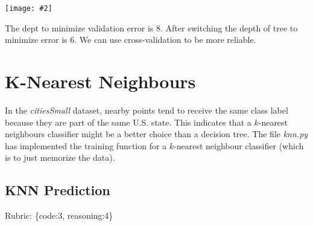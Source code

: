 \documentclass{article}
\def\gre#1{{\color{gre}#1}}
\newcommand{\fig}[2]{\texttt{[image: \#2]}}
\def\rubric#1{\gre{Rubric: \{#1\}}}{}
\begin{document}
\fig{0.5}{../figs/q3_2_tree_errors}

The dept to minimize validation error is 8. After switching the depth of tree to minimize error is 6. We can use cross-validation to be more reliable.

\section{K-Nearest Neighbours}

In the \emph{citiesSmall} dataset, nearby points tend to receive the same class label because they are part of the same U.S. state. This indicates that a $k$-nearest neighbours classifier might be a better choice than a decision tree. The file \emph{knn.py} has implemented the training function for a $k$-nearest neighbour classifier (which is to just memorize the data).


\subsection{KNN Prediction}
\rubric{code:3, reasoning:4}
\end{document}
